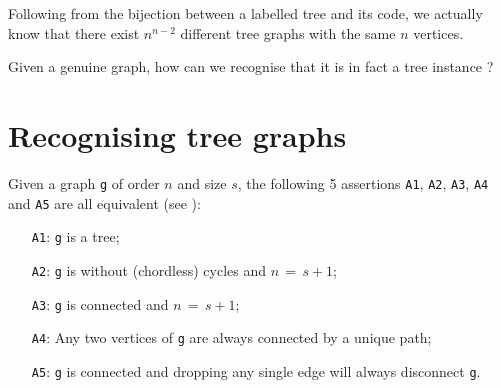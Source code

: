 Following from the bijection between a labelled tree and its \Pruefer code, we actually know that there exist $n^{n-2}$ different tree graphs with the same $n$ vertices.

Given a genuine graph, how can we recognise that it is in fact a tree instance ?

\section{Recognising tree graphs}
\label{sec:22.2}

Given a graph \texttt{g} of order $n$ and size $s$, the following 5 assertions \texttt{A1}, \texttt{A2}, \texttt{A3}, \texttt{A4} and \texttt{A5} are all equivalent (see \citep{JPB-1991}):
\begin{itemize}
\item [\texttt{A1}:] \texttt{g} is a tree;
\item [\texttt{A2}:] \texttt{g} is without (chordless) cycles and $n \,=\, s + 1$;
\item [\texttt{A3}:] \texttt{g} is connected and $n \,=\, s + 1$;
\item [\texttt{A4}:] Any two vertices of \texttt{g} are always connected by a unique path;
\item [\texttt{A5}:] \texttt{g} is connected and dropping any single edge will always disconnect \texttt{g}.
\end{itemize}

